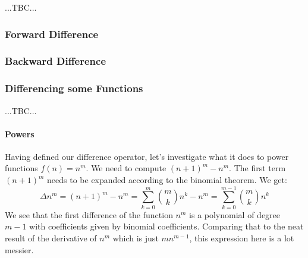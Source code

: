 

...TBC...


\subsubsection{Forward Difference}



\subsubsection{Backward Difference}






\subsubsection{Differencing some Functions} ...TBC...

\paragraph{Powers}
Having defined our difference operator, let's investigate what it does to power functions $f(n) = n^m$. We need to compute $(n+1)^m - n^m$. The first term $(n+1)^m$ needs to be expanded according to the binomial theorem. We get:
\begin{equation}
\Delta n^m = (n+1)^m                           - n^m
           = \sum_{k=0}^{m}   \binom{m}{k} n^k - n^m
           = \sum_{k=0}^{m-1} \binom{m}{k} n^k
\end{equation}
We see that the first difference of the function $n^m$ is a polynomial of degree $m-1$ with coefficients given by binomial coefficients. Comparing that to the neat result of the derivative of $n^m$ which is just $m n^{m-1}$, this expression here is a lot messier. 

